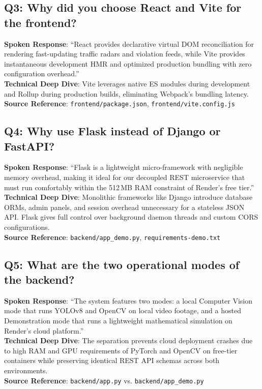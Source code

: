 \subsection*{Q3: Why did you choose React and Vite for the frontend?}
\begin{interviewbox}
\textbf{Spoken Response}: ``React provides declarative virtual DOM reconciliation for rendering fast-updating traffic radars and violation feeds, while Vite provides instantaneous development HMR and optimized production bundling with zero configuration overhead.''\\
\textbf{Technical Deep Dive}: Vite leverages native ES modules during development and Rollup during production builds, eliminating Webpack's bundling latency.\\
\textbf{Source Reference}: \texttt{frontend/package.json}, \texttt{frontend/vite.config.js}
\end{interviewbox}

\subsection*{Q4: Why use Flask instead of Django or FastAPI?}
\begin{interviewbox}
\textbf{Spoken Response}: ``Flask is a lightweight micro-framework with negligible memory overhead, making it ideal for our decoupled REST microservice that must run comfortably within the 512\,MB RAM constraint of Render's free tier.''\\
\textbf{Technical Deep Dive}: Monolithic frameworks like Django introduce database ORMs, admin panels, and session overhead unnecessary for a stateless JSON API. Flask gives full control over background daemon threads and custom CORS configurations.\\
\textbf{Source Reference}: \texttt{backend/app\_demo.py}, \texttt{requirements-demo.txt}
\end{interviewbox}

\subsection*{Q5: What are the two operational modes of the backend?}
\begin{interviewbox}
\textbf{Spoken Response}: ``The system features two modes: a local Computer Vision mode that runs YOLOv8 and OpenCV on local video footage, and a hosted Demonstration mode that runs a lightweight mathematical simulation on Render's cloud platform.''\\
\textbf{Technical Deep Dive}: The separation prevents cloud deployment crashes due to high RAM and GPU requirements of PyTorch and OpenCV on free-tier containers while preserving identical REST API schemas across both environments.\\
\textbf{Source Reference}: \texttt{backend/app.py} vs. \texttt{backend/app\_demo.py}
\end{interviewbox}

